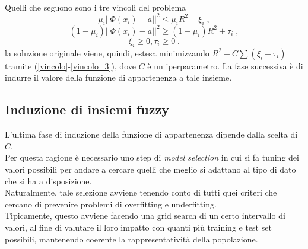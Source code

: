 \documentclass[12pt]{report}
\theoremstyle{definition}
\begin{document}
\\
Quelli che seguono sono i tre vincoli del problema
\begin{equation}\label{vincolo}
    \mu_i || \mathit{\Phi}(x_i) - a ||^2 \leq \mu_iR^2 + \xi_i \;,
\end{equation}
\begin{equation}\label{vincolo_2}
    (1 - \mu_i) || \mathit{\Phi}(x_i) - a ||^2 \geq (1 - \mu_i)R^2 + \tau_i \;,
\end{equation}
\begin{equation}\label{vincolo_3}
    \xi_i \geq 0, \tau_i \geq 0 \;.
\end{equation}
la soluzione originale viene, quindi, estesa minimizzando $R^2 + C\sum(\xi_i + \tau_i)$ tramite (\ref{vincolo}-\ref{vincolo_3}), dove $C$ è un iperparametro.
La fase successiva è di indurre il valore della funzione di appartenenza a tale insieme.

\subsection{Induzione di insiemi fuzzy}
L'ultima fase di induzione della funzione di appartenenza dipende dalla scelta di $C$.
\\
Per questa ragione è necessario uno step di \textit{model selection} in cui si fa tuning dei valori possibili per andare a cercare quelli che meglio si adattano al tipo di dato che si ha a disposizione.
\\
Naturalmente, tale selezione avviene tenendo conto di tutti quei criteri che cercano di prevenire problemi di overfitting e underfitting.
\\
Tipicamente, questo avviene facendo una grid search di un certo intervallo di valori, al fine di valutare il loro impatto con quanti più training e test set possibili, mantenendo coerente la rappresentatività della popolazione.
\end{document}
